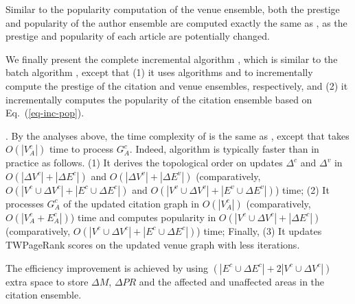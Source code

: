 {Similar to the popularity computation of the venue ensemble, both the prestige and popularity of the author ensemble are computed exactly the same as \batensemble, as the prestige and popularity of each article are potentially changed.

We finally present the complete incremental algorithm \incensemble, which is similar to the batch algorithm \batensemble, except that (1) it uses algorithms \inctwprdag and \inctwprscc to incrementally compute the prestige of the citation and venue ensembles, respectively, and (2) it incrementally computes the popularity of the citation ensemble based on Eq.~(\ref{eq-inc-pop}).



.
By the analyses above, the time complexity of \incensemble is the same as \batensemble, except that \incensemble takes $O(|V^c_A|)$ time to process $G^c_A$.
Indeed, algorithm \incensemble is typically faster than \batensemble in practice as follows.
(1) It derives the topological order on updates $\Delta^c$ and $\Delta^v$ in $O(|\Delta V^c|+|\Delta E^c|)$ and $O(|\Delta V^v|+|\Delta E^v|)$ (comparatively, $O(|V^c\cup\Delta V^c|+|E^c\cup \Delta E^c|)$ and $O(|V^v\cup \Delta V^v|+|E^v\cup \Delta E^v|)$) time;
(2) It processes $G^c_A$ of the updated citation graph in $O(|V^c_A|)$ (comparatively, $O(|V^c_A+E^c_A|)$) time and computes popularity in $O(|V^c\cup\Delta V^c|+|\Delta E^c|)$ (comparatively, $O(|V^c\cup\Delta V^c|+|E^c\cup \Delta E^c|)$) time;
Finally, (3) It updates TWPageRank scores on the updated venue graph with less iterations.

The efficiency improvement is achieved by using $(|E^c\cup \Delta E^c|+2|V^c\cup\Delta V^c|)$ extra space to store $\Delta M$, $\Delta PR$ and the affected and unaffected areas in the citation ensemble.



}



